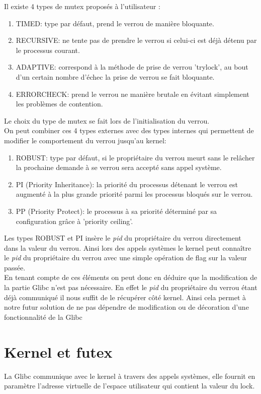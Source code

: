 Il existe 4 types de mutex proposés à l'utilisateur :
\begin{enumerate}
	\item TIMED: type par défaut, prend le verrou de manière bloquante.
	\item RECURSIVE: ne tente pas de prendre le verrou si celui-ci est
	déjà détenu par le processus courant.
	\item ADAPTIVE: correspond à la méthode de prise de verrou 'trylock',
	au bout d'un certain nombre d'échec la prise de verrou se fait
	bloquante.
	\item ERRORCHECK: prend le verrou ne manière brutale en évitant
	simplement les problèmes de contention.
\end{enumerate}
Le choix du type de mutex se fait lors de l'initialisation du verrou.
\\
On peut combiner ces 4 types externes avec des types internes qui permettent de
modifier le comportement du verrou jusqu'au kernel:
\newpage
\begin{enumerate}
	\item ROBUST: type par défaut, si le propriétaire du verrou meurt sans
	le relâcher la prochaine demande à se verrou sera accepté sans appel
	système.
	\item PI (Priority Inheritance): la priorité du processus détenant le
	verrou est augmenté à la plus grande priorité parmi les processus
	bloqués sur le verrou.
	\item PP (Priority Protect): le processus à sa priorité déterminé par
	sa configuration grâce à 'priority ceiling'.
\end{enumerate}
Les types ROBUST et PI insère le \textit{pid} du propriétaire du verrou
directement dans la valeur du verrou. Ainsi lors des appels systèmes le kernel
peut connaître le \textit{pid} du propriétaire du verrou avec une simple
opération de flag sur la valeur passée.
\\

En tenant compte de ces éléments on peut donc en déduire que la modification 
de la partie Glibc n'est pas nécessaire. En effet le \textit{pid} du 
propriétaire du verrou étant déjà communiqué il nous suffit de le récupérer 
côté kernel. Ainsi cela permet à notre futur solution de ne pas dépendre de 
modification ou de décoration d'une fonctionnalité de la Glibc
\newpage
\section*{Kernel et futex}
La Glibc communique avec le kernel à travers des appels systèmes, elle fournit 
en paramètre l'adresse virtuelle de l'espace utilisateur qui contient la 
valeur du lock.
\\

